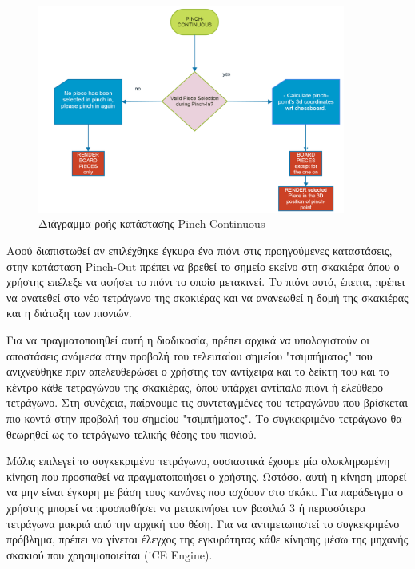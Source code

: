 \begin{figure}[H]
    \centering
    \includegraphics[width=0.9\textwidth]{Files/Figures/pinch_continuous_state.png}
    \caption[Διάγραμμα ροής κατάστασης Pinch-Continuous]{Διάγραμμα ροής κατάστασης Pinch-Continuous}
    \label{fig:pinch-continuous}
\end{figure}



Αφού διαπιστωθεί αν επιλέχθηκε έγκυρα ένα πιόνι στις προηγούμενες καταστάσεις, στην κατάσταση Pinch-Out πρέπει να βρεθεί το σημείο εκείνο στη σκακιέρα όπου ο χρήστης επέλεξε να αφήσει το πιόνι το οποίο μετακινεί. Το πιόνι αυτό, έπειτα, πρέπει να ανατεθεί στο νέο τετράγωνο της σκακιέρας και να ανανεωθεί η δομή της σκακιέρας και η διάταξη των πιονιών.

Για να πραγματοποιηθεί αυτή η διαδικασία, πρέπει αρχικά να υπολογιστούν οι αποστάσεις ανάμεσα στην προβολή του τελευταίου σημείου "τσιμπήματος" που ανιχνεύθηκε πριν απελευθερώσει ο χρήστης τον αντίχειρα και το δείκτη του και το κέντρο κάθε τετραγώνου της σκακιέρας, όπου υπάρχει αντίπαλο πιόνι ή ελεύθερο τετράγωνο. Στη συνέχεια, παίρνουμε τις συντεταγμένες του τετραγώνου που βρίσκεται πιο κοντά στην προβολή του σημείου "τσιμπήματος". Το συγκεκριμένο τετράγωνο θα θεωρηθεί ως το τετράγωνο τελικής θέσης του πιονιού. 


Μόλις επιλεγεί το συγκεκριμένο τετράγωνο, ουσιαστικά έχουμε μία ολοκληρωμένη κίνηση που προσπαθεί να πραγματοποιήσει ο χρήστης. Ωστόσο, αυτή η κίνηση μπορεί να μην είναι έγκυρη με βάση τους κανόνες που ισχύουν στο σκάκι. Για παράδειγμα ο χρήστης μπορεί να προσπαθήσει να μετακινήσει τον βασιλιά 3 ή περισσότερα τετράγωνα μακριά από την αρχική του θέση. Για να αντιμετωπιστεί το συγκεκριμένο πρόβλημα, πρέπει να γίνεται έλεγχος της εγκυρότητας κάθε κίνησης μέσω της μηχανής σκακιού που χρησιμοποιείται (iCE Engine). 


